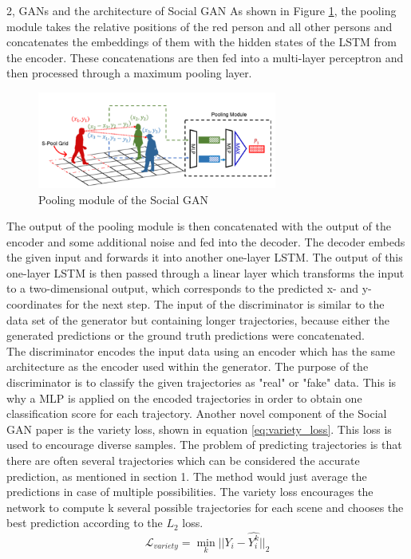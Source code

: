 \documentclass[10pt,a4paper]{article}
\begin{document}
\begin{task}{2, GANs and the architecture of Social GAN}
    As shown in Figure \ref{fig:pooling_module}, the pooling module takes the relative positions of the red person and all other persons and concatenates the embeddings of them with the hidden states of the LSTM from the encoder. These concatenations are then fed into a multi-layer perceptron and then processed through a maximum pooling layer.
    \begin{figure}[H]
        \centering
        \includegraphics[width=0.7\textwidth]{pictures/pooling_module.png}
        \caption{Pooling module of the Social GAN \cite{gupta2018social}}
        \label{fig:pooling_module}
    \end{figure}
    The output of the pooling module is then concatenated with the output of the encoder and some additional noise and fed into the decoder. The decoder embeds the given input and forwards it into another one-layer LSTM. The output of this one-layer LSTM is then passed through a linear layer which transforms the input to a two-dimensional output, which corresponds to the predicted x- and y-coordinates for the next step. \bigbreak
    The input of the discriminator is similar to the data set of the generator but containing longer trajectories, because either the generated predictions or the ground truth predictions were concatenated.\\
    The discriminator encodes the input data using an encoder which has the same architecture as the encoder used within the generator. The purpose of the discriminator is to classify the given trajectories as "real" or "fake" data. This is why a MLP is applied on the encoded trajectories in order to obtain one classification score for each trajectory.\bigbreak
    Another novel component of the Social GAN paper is the variety loss, shown in equation \ref{eq:variety_loss}. This loss is used to encourage diverse samples. The problem of predicting trajectories is that there are often several trajectories which can be considered the accurate prediction, as mentioned in section 1. The method would just average the predictions in case of multiple possibilities. The variety loss encourages the network to compute k several possible trajectories for each scene and chooses the best prediction according to the $L_2$ loss. \cite{gupta2018social}
    \begin{equation}\label{eq:variety_loss}
        \mathcal{L}_{variety} = \min_k||Y_i - \hat{Y_i^{k}}||_2
    \end{equation}
\end{task}
\end{document}
